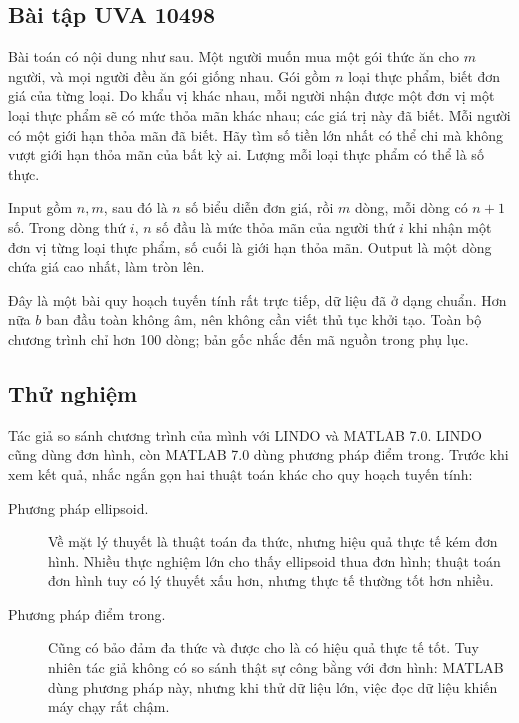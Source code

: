 \documentclass[11pt]{article}
\begin{document}
\subsection*{Bài tập UVA 10498}

Bài toán có nội dung như sau. Một người muốn mua một gói thức ăn cho $m$
người, và mọi người đều ăn gói giống nhau. Gói gồm $n$ loại thực phẩm, biết
đơn giá của từng loại. Do khẩu vị khác nhau, mỗi người nhận được một đơn vị
một loại thực phẩm sẽ có mức thỏa mãn khác nhau; các giá trị này đã biết. Mỗi
người có một giới hạn thỏa mãn đã biết. Hãy tìm số tiền lớn nhất có thể chi
mà không vượt giới hạn thỏa mãn của bất kỳ ai. Lượng mỗi loại thực phẩm có
thể là số thực.

Input gồm $n,m$, sau đó là $n$ số biểu diễn đơn giá, rồi $m$ dòng, mỗi dòng
có $n+1$ số. Trong dòng thứ $i$, $n$ số đầu là mức thỏa mãn của người thứ
$i$ khi nhận một đơn vị từng loại thực phẩm, số cuối là giới hạn thỏa mãn.
Output là một dòng chứa giá cao nhất, làm tròn lên.

Đây là một bài quy hoạch tuyến tính rất trực tiếp, dữ liệu đã ở dạng chuẩn.
Hơn nữa $b$ ban đầu toàn không âm, nên không cần viết thủ tục khởi tạo. Toàn
bộ chương trình chỉ hơn 100 dòng; bản gốc nhắc đến mã nguồn trong phụ lục.

\subsection{Thử nghiệm}

Tác giả so sánh chương trình của mình với LINDO và MATLAB 7.0. LINDO cũng
dùng đơn hình, còn MATLAB 7.0 dùng phương pháp điểm trong. Trước khi xem kết
quả, nhắc ngắn gọn hai thuật toán khác cho quy hoạch tuyến tính:

\begin{description}
  \item[Phương pháp ellipsoid.] Về mặt lý thuyết là thuật toán đa thức, nhưng
  hiệu quả thực tế kém đơn hình. Nhiều thực nghiệm lớn cho thấy ellipsoid
  thua đơn hình; thuật toán đơn hình tuy có lý thuyết xấu hơn, nhưng thực tế
  thường tốt hơn nhiều.

  \item[Phương pháp điểm trong.] Cũng có bảo đảm đa thức và được cho là có
  hiệu quả thực tế tốt. Tuy nhiên tác giả không có so sánh thật sự công bằng
  với đơn hình: MATLAB dùng phương pháp này, nhưng khi thử dữ liệu lớn, việc
  đọc dữ liệu khiến máy chạy rất chậm.
\end{description}
\end{document}
